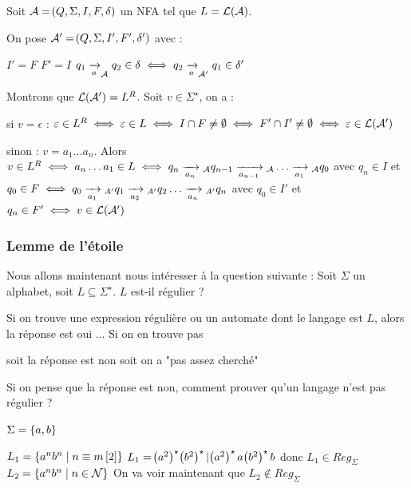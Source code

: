     \begin{nproof}
        Soit $\mathcal{A} = \!\left(Q, \Sigma, I, F, \delta\right)$ un NFA tel que $L = \mathcal{L}\!\left(\mathcal{A}\right)$.
        
        On pose $\mathcal{A}' = \!\left(Q, \Sigma, I', F', \delta'\right)$ avec :
        \begin{enumerate}
            \itt $I' = F$
            \itt $F' = I$
            \itt $q_1 \lima{a}_\bcA q_2 \in \delta \iff q_2 \lima{a}_{\bcA'} q_1 \in \delta'$
        \end{enumerate}
        Montrons que $\mathcal{L}\!\left(\mathcal{A}'\right) = L^R$. Soit $v \in \Sigma^\star$, on a :
        \begin{enumerate}
            \itt si $v = \epsilon$ : $\varepsilon \in L^R \iff \varepsilon \in L \iff I \cap F \neq \emptyset \iff F' \cap I' \neq \emptyset \iff \varepsilon \in \mathcal{L}\!\left(\mathcal{A}'\right)$
            
            \itt sinon : $v = a_1 \dots a_n$.
            Alors $v \in L^R \iff a_n \dots a_1 \in L \iff q_n \lima{a_{n}}{}_\bcA q_{n-1} \lima{a_{n-1}}{}_\bcA \dots \lima{a_1}{}_\bcA q_0$ avec $q_n \in I$ et $q_0 \in F \iff q_0 \lima{a_1}{}_{A'} q_1 \lima{a_2}{}_{A'} q_2 \dots \lima{a_n}{}_{A'} q_n$ avec $q_0 \in I'$ et $q_n \in F' \iff v \in \mathcal{L}\!\left(\mathcal{A}'\right)$
        \end{enumerate}
    \end{nproof}
    
    \subsubsection{Lemme de l'étoile}
    
    Nous allons maintenant nous intéresser à la question suivante :
    Soit $\Sigma$ un alphabet, soit $L \subseteq \Sigma^\star$. $L$ est-il régulier ?
    \begin{enumerate}
        \itt Si on trouve une expression régulière ou un automate dont le langage est $L$, alors la réponse est oui $\dots$
        \itt Si on en trouve pas
        \begin{enumerate}
            \itt soit la réponse est non
            \itt soit on a "pas assez cherché"
        \end{enumerate}
    \end{enumerate}
    Si on pense que la réponse est non, comment prouver qu'un langage n'est pas régulier ?
    
    \begin{example}{}{}
        $\Sigma = \left\{a, b\right\}$
        \begin{enumerate}
            \itt $L_1 = \left\{a^n b^n\;\middle\vert\; n \equiv m \left[2\right]\right\}$
            $L_1 = \!\left(a^2\right)^\star \!\left(b^2\right)^\star \vert \!\left(a^2\right)^\star a \!\left(b^2\right)^\star b$
            donc $L_1 \in Reg_\Sigma$
            \itt $L_2 = \left\{a^n b^n \;\middle\vert\; n \in \mathcal{N}\right\}$
            On va voir maintenant que $L_2 \notin Reg_\Sigma$
        \end{enumerate}
    \end{example}
    

